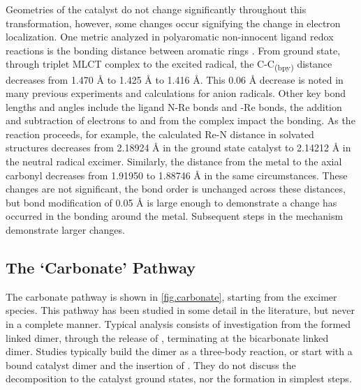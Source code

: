 


Geometries of the catalyst do not change significantly throughout this transformation, however, some changes occur signifying the change in electron localization. One metric analyzed in polyaromatic non-innocent ligand redox reactions is the bonding distance between aromatic rings \autocite{bokarev2014}. From ground state, through triplet MLCT complex to the excited radical, the C-C\textsubscript{(bpy)} distance decreases from 1.470 \r{A} to 1.425 \r{A} to 1.416 \r{A}. This 0.06 \r{A} decrease is noted in many previous experiments and calculations for anion radicals\autocite{bokarev2014, chisholm1981, castellaventura2000, gorerandall2009, irwin2010}. Other key bond lengths and angles include the ligand N-Re bonds and -Re bonds, the addition and subtraction of electrons to and from the complex impact the bonding. As the reaction proceeds, for example, the calculated Re-N distance in solvated structures decreases from 2.18924 \r{A} in the ground state catalyst to 2.14212 \r{A} in the neutral radical excimer. Similarly, the distance from the metal to the axial carbonyl decreases from 1.91950 to 1.88746 \r{A} in the same circumstances. These changes are not significant, the bond order is unchanged across these distances, but bond modification of 0.05 \r{A} is large enough to demonstrate a change has occurred in the bonding around the metal. Subsequent steps in the mechanism demonstrate larger changes.

\subsection{The `Carbonate' Pathway}\label{ss.carbonate}

The carbonate pathway is shown in \autoref{fig.carbonate}, starting from the excimer species. This pathway has been studied in some detail in the literature, but never in a complete manner. Typical analysis consists of investigation from the formed  linked dimer, through the release of , terminating at the bicarbonate linked dimer. Studies typically build the dimer as a three-body reaction, or start with a  bound catalyst dimer and the insertion of . They do not discuss the decomposition to the catalyst ground states, nor the formation in simplest steps.

